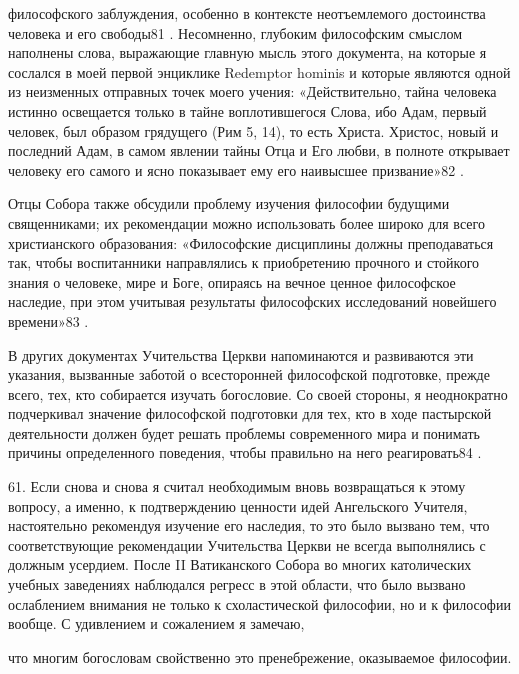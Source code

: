 \documentclass[a5paper,10pt]{article}
\begin{document}
философского заблуждения, особенно в контексте неотъемлемого достоинства
человека и его свободы81 . Несомненно, глубоким философским смыслом наполнены
слова, выражающие главную мысль этого документа, на которые я сослался в моей
первой энциклике Redemptor hominis и которые являются одной из неизменных
отправных точек моего учения: «Действительно, тайна человека истинно освещается
только в тайне воплотившегося Слова, ибо Адам, первый человек, был образом
грядущего (Рим 5, 14), то есть Христа. Христос, новый и последний Адам, в самом
явлении тайны Отца и Его любви, в полноте открывает человеку его самого и ясно
показывает ему его наивысшее призвание»82 .

Отцы Собора также обсудили проблему изучения философии будущими священниками;
их рекомендации можно использовать более широко для всего христианского
образования: «Философские дисциплины должны преподаваться так, чтобы
воспитанники направлялись к приобретению прочного и стойкого знания о человеке,
мире и Боге, опираясь на вечное ценное философское наследие, при этом учитывая
результаты философских исследований новейшего времени»83 .

В других документах Учительства Церкви напоминаются и развиваются эти указания,
вызванные заботой о всесторонней философской подготовке, прежде всего, тех, кто
собирается изучать богословие. Со своей стороны, я неоднократно подчеркивал
значение философской подготовки для тех, кто в ходе пастырской деятельности
должен будет решать проблемы современного мира и понимать причины определенного
поведения, чтобы правильно на него реагировать84 .

61. Если снова и снова я считал необходимым вновь возвращаться к этому вопросу,
а именно, к подтверждению ценности идей Ангельского Учителя, настоятельно
рекомендуя изучение его наследия, то это было вызвано тем, что соответствующие
рекомендации Учительства Церкви не всегда выполнялись с должным усердием. После
II Ватиканского Собора во многих католических учебных заведениях наблюдался
регресс в этой области, что было вызвано ослаблением внимания не только к
схоластической философии, но и к философии вообще. С удивлением и сожалением я
замечаю,

что многим богословам свойственно это пренебрежение, оказываемое философии.
\end{document}
